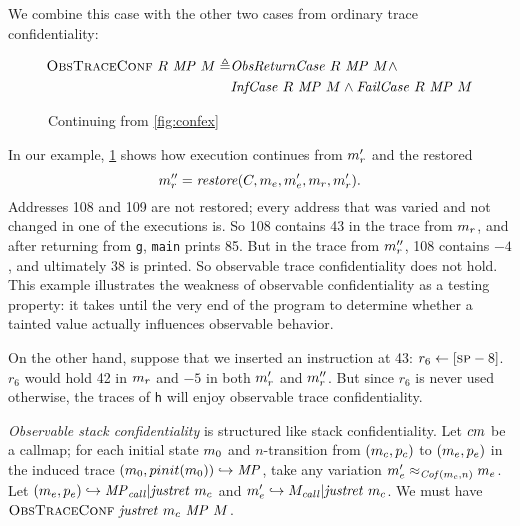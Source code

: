 \documentclass[acmsmall,review,anonymous]{acmart}\settopmatter{printfolios=true,printccs=false,printacmref=false}
\begin{document}
{      We combine this case with the other two cases from ordinary trace
      confidentiality:

      \[\begin{split}
        \text{\sc ObsTraceConf} ~  R ~ \mathit{MP} ~ M \triangleq
        & \mathit{ObsReturnCase} ~ R ~ \mathit{MP} ~ M \land \\
        & \mathit{InfCase} ~ R ~ \mathit{MP} ~ M \land \mathit{FailCase} ~ R ~
          \mathit{MP} ~ M \\
      \end{split}\]

      \begin{figure}
        \confidentialitylazyexample
        \caption{Continuing from \cref{fig:confex}}
        \label{fig:conflex}
      \end{figure}

      In our example, \cref{fig:conflex} shows how execution continues from
      \(m_r'\) and the restored
      \[m_r'' = \mathit{restore}(C,
      m_e,m_e',m_r,m_r').
      \]
      Addresses 108 and 109
      are not restored; every address that was varied and not changed in one
      of the executions is. So 108 contains 43 in the trace from \(m_r\),
      and after returning from {\tt g}, {\tt main} prints 85. But in the trace
      from \(m_r''\), 108 contains $-4$, and ultimately 38 is printed.
      So observable trace confidentiality does not hold. This example
      illustrates the weakness of observable confidentiality as a testing
      property: it takes until the very end of the program to determine whether
      a tainted value actually influences observable behavior.

      On the other hand, suppose that we inserted an instruction at 43:
      \(r_6 \leftarrow [\textsc{sp}-8]\). \(r_6\) would hold 42 in \(m_r\)
      and $-5$ in both \(m_r'\) and \(m_r''\). But since \(r_6\) is
      never used otherwise, the traces of {\tt h} will enjoy observable trace
      confidentiality.


      {\em Observable stack confidentiality} is structured like stack
      confidentiality. Let \(cm\) be a callmap; for each initial
      state \(m_0\) and \(n\)-transition from \((m_c,p_c)\)
      to \((m_e,p_e)\) in the induced trace
      \((m_0,pinit(m_0)) \hookrightarrow \mathit{MP}\), take any
      variation \(m_e' \approx_{\mathit{Cof}(m_c,n)} m_e\). Let
      \((m_e,p_e) \hookrightarrow \mathit{MP}_{\mathit{call}} |
      \mathit{justret}\ m_c\) and \(m_e' \hookrightarrow M_{\mathit{call}} |
      \mathit{justret}\ m_c\). We must have \(\text{\sc ObsTraceConf} ~
      \mathit{justret}\ m_c ~ \mathit{MP} ~ M\).

}
\end{document}
